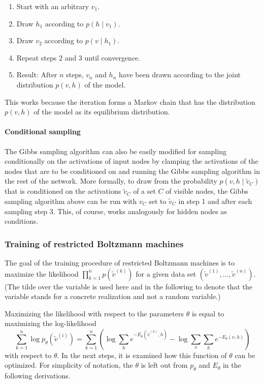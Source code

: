 \documentclass[12pt]{article}
\begin{document}
\begin{enumerate}
\item Start with an arbitrary $v_1$.
\item Draw $h_1$ according to $p(h \mid v_1)$.
\item Draw $v_2$ according to $p(v \mid h_1)$.
\item Repeat steps 2 and 3 until convergence.
\item Result: After $n$ steps, $v_n$ and $h_n$ have been drawn according to the joint distribution $p(v,h)$ of the model.
\end{enumerate}

This works because the iteration forms a Markov chain that has the distribution $p(v,h)$ of the model as its equilibrium distribution.

\paragraph{Conditional sampling}\label{condsamplingrbm}
The Gibbs sampling algorithm can also be easily modified for sampling conditionally on the activations of input nodes by clamping the activations of the nodes that are to be conditioned on and running the Gibbs sampling algorithm in the rest of the network.
More formally, to draw from the probability $p(v, h \mid \tilde{v}_C)$ that is conditioned on the activations $\tilde{v}_C$ of a set $C$ of visible nodes, the Gibbs sampling algorithm above can be run with $v_C$ set to $\tilde{v}_C$ in step 1 and after each sampling step 3.
This, of course, works analogously for hidden nodes as conditions.


\subsubsection{Training of restricted Boltzmann machines}\label{rbmtraining}
The goal of the training procedure of restricted Boltzmann machines is to maximize the likelihood $\prod_{k=1}^n p(\tilde{v}^{(k)})$ for a given data set $(\tilde{v}^{(1)}, \dots, \tilde{v}^{(n)})$.
(The tilde over the variable is used here and in the following to denote that the variable stands for a concrete realization and not a random variable.)

Maximizing the likelihood with respect to the parameters $\theta$ is equal to maximizing the log-likelihood
\[
\sum_{k=1}^{n}  \log p_\theta(\tilde{v}^{(i)}) = \sum_{k=1}^{n} \left( \log \sum_h e^{-E_\theta(\tilde{v}^{(k)}, h)} - \log \sum_v \sum_h e^{-E_\theta(v, h)} \right)
\]
with respect to $\theta$.
In the next steps, it is examined how this function of $\theta$ can be optimized.
For simplicity of notation, the $\theta$ is left out from $p_\theta$ and $E_\theta$ in the following derivations.
\end{document}
